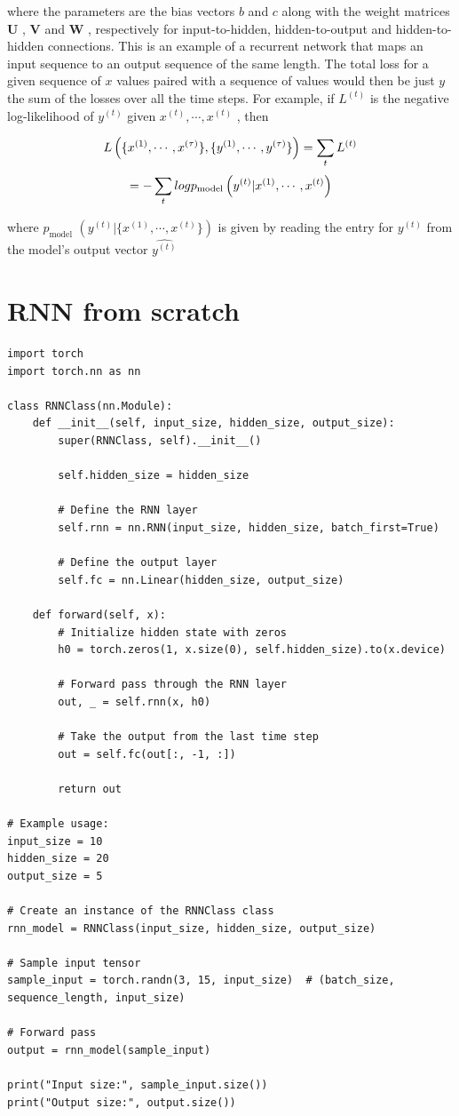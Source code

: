 \documentclass{report}
\begin{document}
where the parameters are the bias vectors $b$ and $c$ along with the weight matrices $\mathbf{U}$ , $\mathbf{V}$ and $\mathbf{W}$ , respectively for input-to-hidden, hidden-to-output and hidden-to-hidden connections. This is an example of a recurrent network that maps an input sequence to an output sequence of the same length. The total loss for a given sequence of $x$ values paired with a sequence of values would then be just $y$ the sum of the losses over all the time steps. For example, if $L^{(t)}$ is the negative log-likelihood of $y^{(t)}$ given $x^{(t)}, \cdots , x^{(t)}$ , then

$$L\left(\{x^{(1)}, \cdots, x^{(\tau)}\}, \{y^{(1)}, \cdots, y^{(\tau)}\}\right) = \sum_t L^{(t)}$$
$$= - \sum_t log p_{\text{model}}\left(y^{(t)} | x^{(1)}, \cdots, x^{(t)}\right)$$

where $p_\text{model}$ $(y^{(t)} | \{x^{(1)}, \cdots, x^{(t)}\})$ is given by reading the entry for $y^{(t)}$ from the model’s output vector $\hat{y^{(t)}}$

\section{RNN from scratch}
\begin{verbatim}
import torch
import torch.nn as nn

class RNNClass(nn.Module):
    def __init__(self, input_size, hidden_size, output_size):
        super(RNNClass, self).__init__()
        
        self.hidden_size = hidden_size
        
        # Define the RNN layer
        self.rnn = nn.RNN(input_size, hidden_size, batch_first=True)
        
        # Define the output layer
        self.fc = nn.Linear(hidden_size, output_size)
        
    def forward(self, x):
        # Initialize hidden state with zeros
        h0 = torch.zeros(1, x.size(0), self.hidden_size).to(x.device)
        
        # Forward pass through the RNN layer
        out, _ = self.rnn(x, h0)
        
        # Take the output from the last time step
        out = self.fc(out[:, -1, :])
        
        return out

# Example usage:
input_size = 10
hidden_size = 20
output_size = 5

# Create an instance of the RNNClass class
rnn_model = RNNClass(input_size, hidden_size, output_size)

# Sample input tensor
sample_input = torch.randn(3, 15, input_size)  # (batch_size, sequence_length, input_size)

# Forward pass
output = rnn_model(sample_input)

print("Input size:", sample_input.size())
print("Output size:", output.size())
\end{verbatim}
\end{document}

